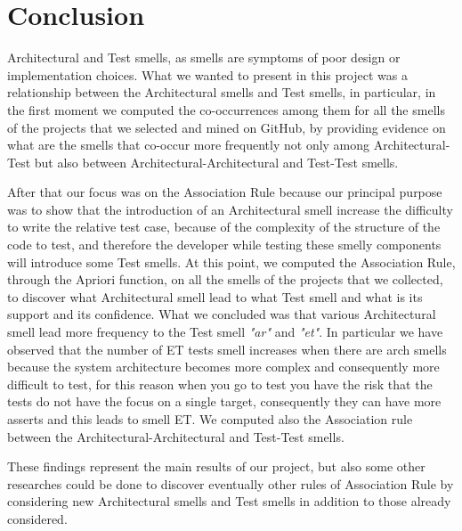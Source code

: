\section{Conclusion}\label{sec:conclusion}

 Architectural and Test smells, as smells are symptoms of poor design or implementation choices. What we wanted to present in this project was a relationship between the Architectural smells and Test smells, in particular, in the first moment we computed the co-occurrences among them for all the smells of the projects that we selected and mined on GitHub, by providing evidence on what are the smells that co-occur more frequently not only among Architectural-Test but also between Architectural-Architectural and Test-Test smells.

After that our focus was on the Association Rule because our principal purpose was to show that the introduction of an Architectural smell increase the difficulty to write the relative test case, because of the complexity of the structure of the code to test, and therefore the developer while testing these smelly components will introduce some Test smells. At this point, we computed the Association Rule, through the Apriori function, on all the smells of the projects that we collected, to discover what Architectural smell lead to what Test smell and what is its support and its confidence. What we concluded was that various Architectural smell lead more frequency to the Test smell \textit{"ar"} and \textit{"et"}. 
In particular we have observed that the number of ET tests smell increases when there are arch smells because the system architecture becomes more complex and consequently more difficult to test, for this reason when you go to test you have the risk that the tests do not have the focus on a single target, consequently they can have more asserts and this leads to smell ET.
We computed also the Association rule between the Architectural-Architectural and Test-Test smells.

These findings represent the main results of our project, but also some other researches could be done to discover eventually other rules of Association Rule by considering new Architectural smells and Test smells in addition to those already considered.
